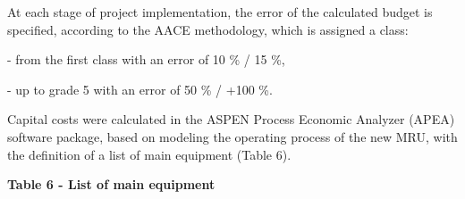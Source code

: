 
At each stage of project implementation, the error of the calculated
budget is specified, according to the AACE methodology, which is
assigned a class:

- from the first class with an error of 10 \% / 15 \%,

- up to grade 5 with an error of 50 \% / +100 \%.

Capital costs were calculated in the ASPEN Process Economic Analyzer
(APEA) software package, based on modeling the operating process of the
new MRU, with the definition of a list of main equipment (Table 6).

{\bfseries Table 6 - List of main equipment}

